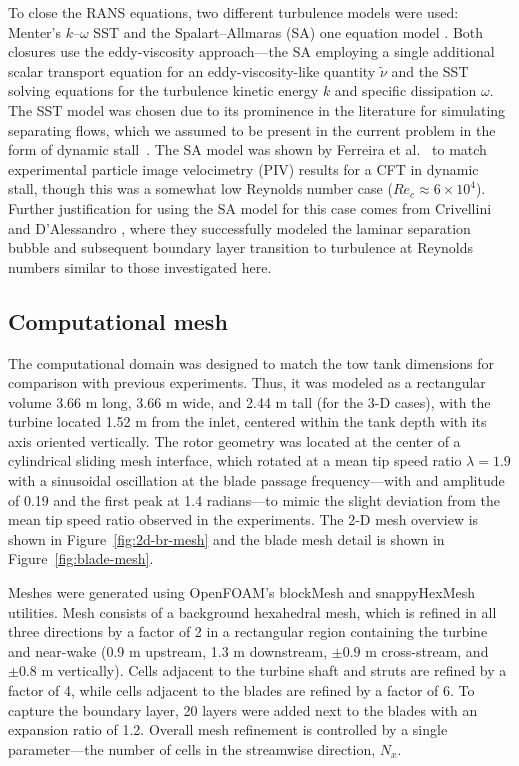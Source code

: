\documentclass[aip,graphicx]{revtex4-1}
\begin{document}
To close the RANS equations, two different turbulence models were used: Menter's
$k$--$\omega$ SST \cite{Menter1994} and the Spalart--Allmaras (SA) one equation
model \cite{Spalart1992}. Both closures use the eddy-viscosity approach---the SA
employing a single additional scalar transport equation for an
eddy-viscosity-like quantity $\tilde{\nu}$ and the SST solving equations for the
turbulence kinetic energy $k$ and specific dissipation $\omega$. The SST model
was chosen due to its prominence in the literature for simulating separating
flows, which we assumed to be present in the current problem in the form of
dynamic stall~\cite{Para2002}. The SA model was shown by Ferreira et
al.~\cite{Ferreira2007} to match experimental particle image velocimetry (PIV)
results for a CFT in dynamic stall, though this was a somewhat low Reynolds
number case ($Re_c \approx 6 \times 10^4$). Further justification for using the
SA model for this case comes from Crivellini and D'Alessandro
\cite{Crivellini2014}, where they successfully modeled the laminar separation
bubble and subsequent boundary layer transition to turbulence at Reynolds
numbers similar to those investigated here.


\subsection{Computational mesh}

The computational domain was designed to match the tow tank dimensions for
comparison with previous experiments. Thus, it was modeled as a rectangular
volume 3.66 m long, 3.66 m wide, and 2.44 m tall (for the 3-D cases), with the
turbine located 1.52 m from the inlet, centered within the tank depth with its
axis oriented vertically. The rotor geometry was located at the center of a
cylindrical sliding mesh interface, which rotated at a mean tip speed ratio
$\lambda=1.9$ with a sinusoidal oscillation at the blade passage
frequency---with and amplitude of 0.19 and the first peak at 1.4 radians---to
mimic the slight deviation from the mean tip speed ratio observed in the
experiments. The 2-D mesh overview is shown in Figure~\ref{fig:2d-br-mesh} and
the blade mesh detail is shown in Figure~\ref{fig:blade-mesh}.

Meshes were generated using OpenFOAM's blockMesh and snappyHexMesh utilities.
Mesh  consists of a background hexahedral mesh, which is refined in all
three directions by a factor of 2 in a rectangular region containing the turbine
and near-wake (0.9 m upstream, 1.3 m downstream, $\pm 0.9$ m cross-stream, and
$\pm 0.8$ m vertically). Cells adjacent to the turbine shaft and struts are
refined by a factor of 4, while cells adjacent to the blades are refined by a
factor of 6. To capture the boundary layer, 20 layers were added next to the
blades with an expansion ratio of 1.2. Overall mesh refinement is controlled by
a single parameter---the number of cells in the streamwise direction, $N_x$.
\end{document}
